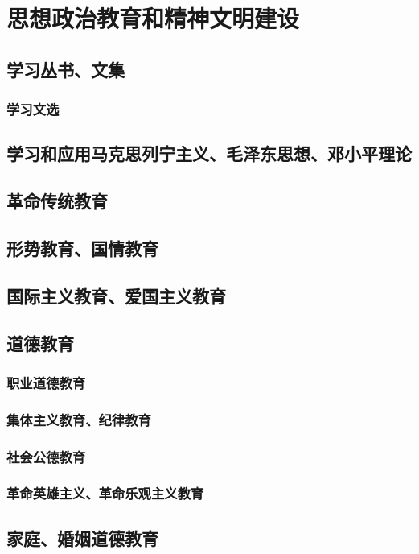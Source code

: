 \documentclass[UTF8]{../RepresentationUniverse}
\begin{document}
\section{思想政治教育和精神文明建设}
\subsection{学习丛书、文集}
    \subsubsection{学习文选}

\subsection{学习和应用马克思列宁主义、毛泽东思想、邓小平理论}
\subsection{革命传统教育}
\subsection{形势教育、国情教育}
\subsection{国际主义教育、爱国主义教育}
\subsection{道德教育}
    \subsubsection{职业道德教育}
    \subsubsection{集体主义教育、纪律教育}
    \subsubsection{社会公德教育}
    \subsubsection{革命英雄主义、革命乐观主义教育}
\subsection{家庭、婚姻道德教育}
\end{document}
